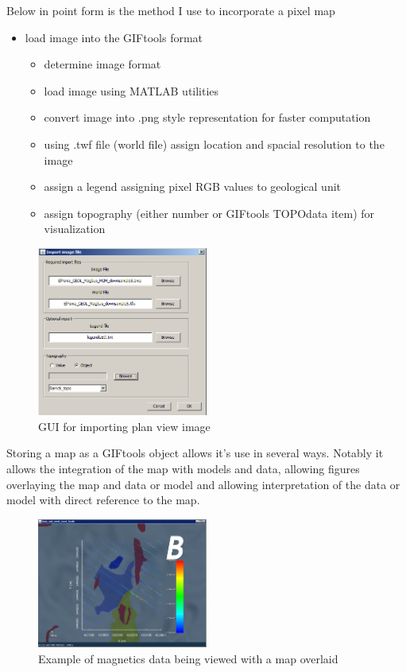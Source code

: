 Below in point form is the method I use to incorporate a pixel map

\begin{itemize}
\item load image into the GIFtools format
\begin{itemize}
	\item determine image format
	\item load image using MATLAB utilities
	\item convert image into .png style representation for faster computation
	\item using .twf file (world file) assign location and spacial resolution to the image
	\item assign a legend assigning pixel RGB values to geological unit
	\item assign topography (either number or GIFtools TOPOdata item) for visualization
\end{itemize}
\end{itemize}
\begin{figure} [h]
    \centering
    \includegraphics[width=0.5\textwidth]{images/GUI/importPlan.PNG}
    \caption{GUI for importing plan view image }
    \label{fig:importPlanGui}
\end{figure}
Storing a map as a GIFtools object allows it's use in several ways. Notably it allows the integration of the map with models and data, allowing figures overlaying the map and data or model and allowing interpretation of the data or model with direct reference to the map.

\begin{figure} [h]
    \centering
    \includegraphics[width=0.5\textwidth]{images/GUI/mapData.PNG}
    \caption{Example of magnetics data being viewed with a map overlaid }
    \label{fig:mapData}
\end{figure}


